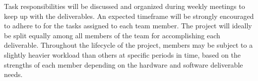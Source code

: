 \documentclass{article}
\begin{document}
\noindent Task responsibilities will be discussed and organized during weekly meetings to keep up with the deliverables. 
An expected timeframe will be strongly encouraged to adhere to for the tasks assigned to each team member. The project 
will ideally be split equally among all members of the team for accomplishing each deliverable. Throughout the lifecycle 
of the project, members may be subject to a slightly heavier workload than others at specific periods in time, based on 
the strengths of each member depending on the hardware and software deliverable needs. 
\end{document}
